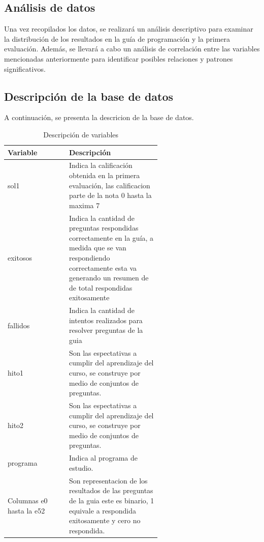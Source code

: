 \subsection{Análisis de datos}

Una vez recopilados los datos, se realizará un análisis descriptivo para examinar la distribución de los resultados en la guía de programación y la primera evaluación. Además, se llevará a cabo un análisis de correlación entre las variables mencionadas anteriormente para identificar posibles relaciones y patrones significativos.

\subsection{Descripción de la base de datos}

A continuación, se presenta la descricion de la base de datos.

\begin{table}[H]
    \centering
    \caption{Descripción de variables}
    \begin{tabular}{|l|p{0.6\linewidth}|}
        \hline
        \textbf{Variable}        & \textbf{Descripción}   \\
        \hline
        sol1                     & Indica la calificación obtenida en la primera evaluación, las calificacion parte de la nota 0 hasta la maxima 7 \\
        \hline
        exitosos                 & Indica la cantidad de preguntas respondidas correctamente en la guía, a medida que se van respondiendo correctamente esta va generando un resumen de de total respondidas exitosamente \\
        \hline
        fallidos                 & Indica la cantidad de intentos realizados para resolver preguntas de la guia \\
        \hline
        hito1                    & Son las espectativas a cumplir del aprendizaje del curso, se construye por medio de conjuntos de preguntas. \\
        \hline
        hito2                    & Son las espectativas a cumplir del aprendizaje del curso, se construye por medio de conjuntos de preguntas. \\
        \hline
        programa                 & Indica al programa de estudio. \\
        \hline
        Columnas e0 hasta la e52 & Son representacion de los resultados de las preguntas de la guia este es binario, 1 equivale a respondida exitosamente y cero no respondida.  \\
        \hline
    \end{tabular}
    \label{tab:variables}
\end{table}

